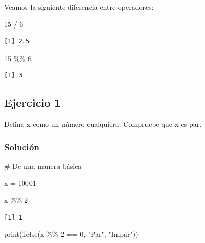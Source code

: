 \documentclass[
  letterpaper,
  DIV=11,
  numbers=noendperiod]{scrartcl}
\newenvironment{Shaded}{\begin{snugshade}}{\end{snugshade}}
\newcommand{\CommentTok}[1]{\textcolor[rgb]{0.37,0.37,0.37}{#1}}
\newcommand{\DecValTok}[1]{\textcolor[rgb]{0.68,0.00,0.00}{#1}}
\newcommand{\FunctionTok}[1]{\textcolor[rgb]{0.28,0.35,0.67}{#1}}
\newcommand{\NormalTok}[1]{\textcolor[rgb]{0.00,0.23,0.31}{#1}}
\newcommand{\OtherTok}[1]{\textcolor[rgb]{0.00,0.23,0.31}{#1}}
\newcommand{\SpecialCharTok}[1]{\textcolor[rgb]{0.37,0.37,0.37}{#1}}
\newcommand{\StringTok}[1]{\textcolor[rgb]{0.13,0.47,0.30}{#1}}
\begin{document}
Veamos la siguiente diferencia entre operadores:

\begin{Shaded}
\begin{Highlighting}[]
\DecValTok{15} \SpecialCharTok{/} \DecValTok{6}
\end{Highlighting}
\end{Shaded}

\begin{verbatim}
[1] 2.5
\end{verbatim}

\begin{Shaded}
\begin{Highlighting}[]
\DecValTok{15} \SpecialCharTok{\%\%} \DecValTok{6}
\end{Highlighting}
\end{Shaded}

\begin{verbatim}
[1] 3
\end{verbatim}

\subsection{Ejercicio 1}\label{ejercicio-1}

Defina x como un número cualquiera. Compruebe que x es par.

\subsubsection{Solución}\label{soluciuxf3n}

\begin{Shaded}
\begin{Highlighting}[]
\CommentTok{\# De una manera básica}

\NormalTok{x }\OtherTok{=} \DecValTok{10001}

\NormalTok{x }\SpecialCharTok{\%\%} \DecValTok{2}
\end{Highlighting}
\end{Shaded}

\begin{verbatim}
[1] 1
\end{verbatim}

\begin{Shaded}
\begin{Highlighting}[]
\FunctionTok{print}\NormalTok{(}\FunctionTok{ifelse}\NormalTok{(x }\SpecialCharTok{\%\%} \DecValTok{2} \SpecialCharTok{==} \DecValTok{0}\NormalTok{, }\StringTok{"Par"}\NormalTok{, }\StringTok{"Impar"}\NormalTok{))}
\end{Highlighting}
\end{Shaded}
\end{document}

